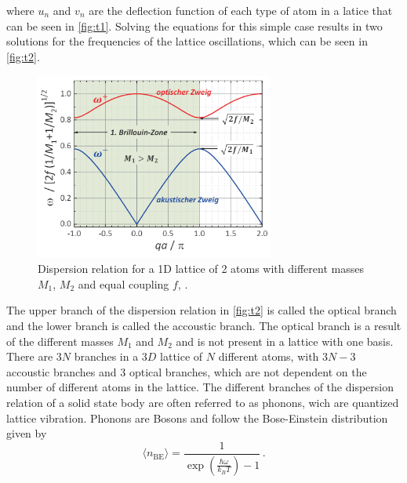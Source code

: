 where $u_n$ and $v_n$ are the deflection function of each type of atom in a latice that can be seen in \autoref{fig:t1}.
Solving the equations for this simple case results in two solutions for the frequencies of the lattice oscillations, which can be seen in \autoref{fig:t2}.
\begin{figure}[H]
    \centering
    \includegraphics[width=0.7\textwidth]{dispersion.pdf}
    \caption{Dispersion relation for a 1D lattice of 2 atoms with different masses $M_1$, $M_2$ and equal coupling $f$, \cite{rehab}.}
    \label{fig:t2}
\end{figure}
\noindent
The upper branch of the dispersion relation in \autoref{fig:t2} is called the optical branch and the lower branch is called the accoustic branch. The optical branch is a result of the different masses $M_1$ and $M_2$ and is not present in a lattice with one basis. There are $3N$ branches in a $3D$ lattice of $N$ different atoms, with $3N-3$ accoustic branches and $3$ optical branches, which are not dependent on the number of different atoms in the lattice.
The different branches of the dispersion relation of a solid state body are often referred to as phonons, wich are quantized lattice vibration. Phonons are Bosons and follow the Bose-Einstein distribution given by 
\begin{equation} 
    \label{eqn:t3}
    \langle n_\text{BE} \rangle = \frac{1}{\exp \left( \frac{\hbar \omega}{k_B T} \right) - 1} \, .
\end{equation}

